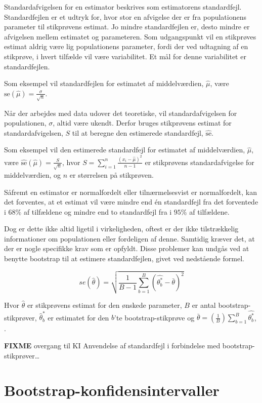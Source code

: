 \documentclass[
]{book}
\theoremstyle{definition}
\theoremstyle{definition}
\theoremstyle{definition}
\theoremstyle{remark}
\begin{document}
Standardafvigelsen for en estimator beskrives som estimatorens standardfejl. Standardfejlen er et udtryk for, hvor stor en afvigelse der er fra populationens parameter til stikprøvens estimat. Jo mindre standardfejlen er, desto mindre er afvigelsen mellem estimatet og parameteren. Som udgangspunkt vil en stikprøves estimat aldrig være lig populationens parameter, fordi der ved udtagning af en stikprøve, i hvert tilfælde vil være variabilitet. Et mål for denne variabilitet er standardfejlen.

Som eksempel vil standardfejlen for estimatet af middelværdien, \(\hat{\mu}\), være \(\text{se}(\hat{\mu}) = \frac{\sigma}{\sqrt{n}}\).

Når der arbejdes med data udover det teoretiske, vil standardafvigelsen for populationen, \(\sigma\), altid være ukendt. Derfor bruges stikprøvens estimat for standardafvigelsen, \(S\) til at beregne den estimerede standardfejl, \(\hat{\text{se}}\).

Som eksempel vil den estimerede standardfejl for estimatet af middelværdien, \(\hat{\mu}\), være \(\hat{\text{se}}(\hat{\mu}) = \frac{S}{\sqrt{n}}\), hvor \(S = \sum_{i=1}^{n} \frac{(x_i - \hat{\mu})^2}{n - 1}\) er stikprøvens standardafvigelse for middelværdien, og \(n\) er størrelsen på stikprøven.

Såfremt en estimator er normalfordelt eller tilnærmelsesvist er normalfordelt, kan det forventes, at et estimat vil være mindre end én standardfejl fra det forventede i \(68\%\) af tilfældene og mindre end to standardfejl fra i \(95\%\) af tilfældene.

Dog er dette ikke altid ligetil i virkeligheden, oftest er der ikke tilstrækkelig informationer om populationen eller fordeligen af denne. Samtidig kræver det, at der er nogle specifikke krav som er opfyldt. Disse problemer kan undgås ved at benytte bootstrap til at estimere standardfejlen, givet ved nedstående formel.

\[se(\hat{\theta}) = \sqrt{\frac{1}{B-1}\sum_{b=1}^{B}(\hat{\theta_b^*} - \bar{\theta} )^2}\]

Hvor \(\hat{\theta}\) er stikprøvens estimat for den ønskede parameter, \(B\) er antal bootstrap-stikprøver, \(\hat\theta_b^*\) er estimatet for den \(b\)'te bootstrap-stikprøve og \(\bar{\theta} = (\frac{1}{B}) \sum_{b=1}^{B}\hat{\theta_b^*}\), \citep{BootMiracle}.

\textbf{FIXME} overgang til KI
Anvendelse af standardfejl i forbindelse med bootstrap-stikprøver\ldots{}

\hypertarget{bootstrap-konfidensintervaller}{%
\section{Bootstrap-konfidensintervaller}\label{bootstrap-konfidensintervaller}}
\end{document}

